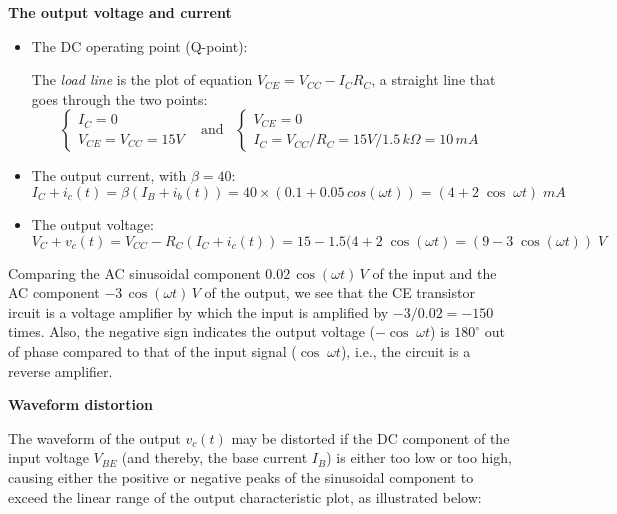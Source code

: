 \documentclass{article}
\begin{document}
{\bf The output voltage and current}

\begin{itemize}
\item The DC operating point (Q-point):

  The {\em load line} is the plot of equation $V_{CE}=V_{CC}-I_C R_C$, a 
  straight line that goes through the two points:
  \begin{equation} 
  \left\{\begin{array}{l}
  I_C=0\\ V_{CE}=V_{CC}=15V\end{array}\right.
  \;\;\;\mbox{and}\;\;\;
  \left\{\begin{array}{l}
  V_{CE}=0\\I_C=V_{CC}/R_C=15V/1.5\,k\Omega=10\, mA \end{array}\right.
  \end{equation}
\item The output current, with $\beta=40$:
  \begin{equation}
  I_C+i_c(t)=\beta (I_B+i_b(t))=40\times (0.1+0.05\, cos(\omega t))
  =(4 + 2\;\cos\;\omega t) \; mA 
  \end{equation}
\item The output voltage:
  \begin{equation}
  V_C+v_c(t)=V_{CC}-R_C(I_C+i_c(t))=15-1.5 (4 + 2\;\cos(\omega t )
  =(9-3\;\cos(\omega t)) \; V  
  \end{equation}
\end{itemize}


Comparing the AC sinusoidal component $0.02\,\cos(\omega t)\,V$ of 
the input and the AC component $-3\,\cos(\omega t)\,V$ of the output,
we see that the CE transistor ircuit is a voltage amplifier by which 
the input is amplified by $-3/0.02=-150$ times. Also, the negative 
sign indicates the output voltage ($-\cos\;\omega t$) is $180^\circ$ 
out of phase compared to that of the input signal ($\cos\;\omega t$), 
i.e., the circuit is a reverse amplifier.

{\bf Waveform distortion}

The waveform of the output $v_c(t)$ may be distorted if the DC component 
of the input voltage $V_{BE}$ (and thereby, the base current $I_B$) is 
either too low or too high, causing either the positive or negative 
peaks of the sinusoidal component to exceed the linear range of the 
output characteristic plot, as illustrated below:
\end{document}
